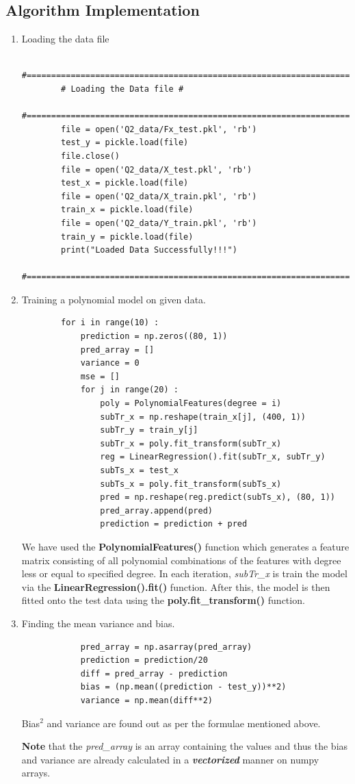 \documentclass[11pt]{article}
\begin{document}
	\subsection{Algorithm Implementation}
	\begin{enumerate}
		\item Loading the data file
		\begin{lstlisting}
		#=============================================================================#
		# Loading the Data file #
		#=============================================================================#
		file = open('Q2_data/Fx_test.pkl', 'rb')
		test_y = pickle.load(file)
		file.close()
		file = open('Q2_data/X_test.pkl', 'rb')
		test_x = pickle.load(file)
		file = open('Q2_data/X_train.pkl', 'rb')
		train_x = pickle.load(file)
		file = open('Q2_data/Y_train.pkl', 'rb')
		train_y = pickle.load(file)
		print("Loaded Data Successfully!!!")
		#=============================================================================#
		\end{lstlisting}
		\item Training a polynomial model on given data.
		\begin{lstlisting}
		for i in range(10) :
			prediction = np.zeros((80, 1))
			pred_array = []
			variance = 0
			mse = []
			for j in range(20) :
				poly = PolynomialFeatures(degree = i)
				subTr_x = np.reshape(train_x[j], (400, 1))
				subTr_y = train_y[j]
				subTr_x = poly.fit_transform(subTr_x)
				reg = LinearRegression().fit(subTr_x, subTr_y)
				subTs_x = test_x
				subTs_x = poly.fit_transform(subTs_x)
				pred = np.reshape(reg.predict(subTs_x), (80, 1))
				pred_array.append(pred)
				prediction = prediction + pred
		\end{lstlisting}
		We have used the \textbf{PolynomialFeatures()} function which generates a feature matrix consisting of all polynomial combinations of the features with degree less or equal to specified degree. In each iteration, \textit{subTr\_x} is train the model via the \textbf{LinearRegression().fit()} function. After this, the model is then fitted onto the test data using the \textbf{poly.fit\_transform()} function. 
		
		\item Finding the mean variance and bias.
		\begin{lstlisting}
			pred_array = np.asarray(pred_array)
			prediction = prediction/20
			diff = pred_array - prediction
			bias = (np.mean((prediction - test_y))**2)
			variance = np.mean(diff**2)
		\end{lstlisting}
		Bias$^2$ and variance are found out as per the formulae mentioned above. 
		
		\textbf{Note} that the \textit{pred\_array} is an array containing the values and thus the bias and variance are already calculated in a \textbf{\textit{vectorized}} manner on numpy arrays.
	\end{enumerate}
\end{document}
